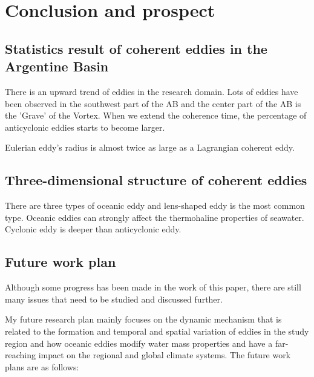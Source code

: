 \chapter{Conclusion and prospect}\label{sec-conclusion}

\section{Statistics result of coherent eddies in the Argentine Basin}


There is an upward trend of eddies in the research domain. Lots of eddies have been observed in the southwest part of the AB and the center part of the AB is the 'Grave' of the Vortex. When we extend the coherence time, the percentage of anticyclonic eddies starts to become larger.

Eulerian eddy's radius is almost twice as large as a Lagrangian coherent eddy.

\section{Three-dimensional structure of coherent eddies}

There are three types of oceanic eddy and lens-shaped eddy is the most common type. Oceanic eddies can strongly affect the thermohaline properties of seawater. Cyclonic eddy is deeper than anticyclonic eddy.

\section{Future work plan}



Although some progress has been made in the work of this paper, there are still many issues that need to be studied and discussed further.

My future research plan mainly focuses on the dynamic mechanism that is related to the formation and temporal and spatial variation of eddies in the study region and how oceanic eddies modify water mass properties and have a far-reaching impact on the regional and global climate systems. The future work plans are as follows:

